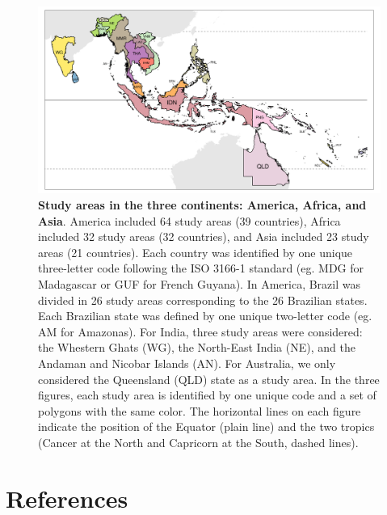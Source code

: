 \documentclass[12pt,]{article}
\begin{document}
\begin{figure}[H]

{\centering \includegraphics[width=\textwidth]{figures/study_areas_Asia_ink} 

}

\caption{\textbf{Study areas in the three continents: America, Africa, and Asia}. America included 64 study areas (39 countries), Africa included 32 study areas (32 countries), and Asia included 23 study areas (21 countries). Each country was identified by one unique three-letter code following the ISO 3166-1 standard (eg. MDG for Madagascar or GUF for French Guyana). In America, Brazil was divided in 26 study areas corresponding to the 26 Brazilian states. Each Brazilian state was defined by one unique two-letter code (eg. AM for Amazonas). For India, three study areas were considered: the Whestern Ghats (WG), the North-East India (NE), and the Andaman and Nicobar Islands (AN). For Australia, we only considered the Queensland (QLD) state as a study area. In the three figures, each study area is identified by one unique code and a set of polygons with the same color. The horizontal lines on each figure indicate the position of the Equator (plain line) and the two tropics (Cancer at the North and Capricorn at the South, dashed lines).}\label{fig:study-areas}
\end{figure}

\newpage

\hypertarget{references}{%
\section*{References}\label{references}}


\end{document}

